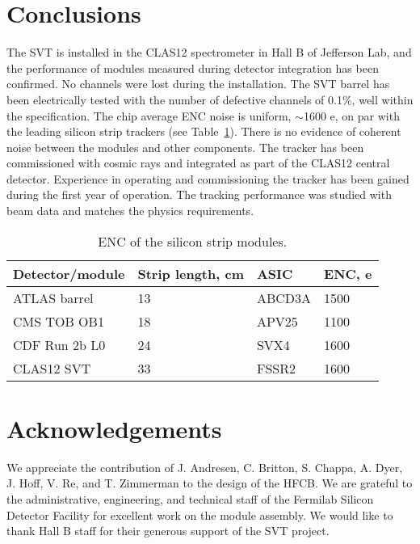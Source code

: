 \section{Conclusions}

The SVT is installed in the CLAS12 spectrometer in Hall B of Jefferson Lab, and the performance of modules measured during detector integration has been confirmed. No channels were lost during the installation. The SVT barrel has been electrically  tested with the number of defective channels of 0.1$\%$, well within the specification. The chip average ENC noise is uniform, $\sim$1600 e, on par with the leading silicon strip trackers (see Table~\ref{tab:enc-table}). There is no evidence of coherent noise between the modules and other components. The tracker has been commissioned with cosmic rays and integrated as part of the CLAS12 central detector. Experience in operating and commissioning the tracker has been gained during the first year of operation. The tracking performance was studied with beam data and matches the physics requirements. 

\begin{table}[hbt]
\begin{tabular}{llll}
\hline
Detector/module      & Strip length, cm & ASIC         & ENC, e\\ \hline
ATLAS barrel           & 13                      & ABCD3A    & 1500  \\
CMS TOB OB1        & 18                      & APV25       & 1100  \\
CDF Run 2b L0        & 24                     & SVX4         & 1600  \\
CLAS12 SVT            & 33                     & FSSR2       & 1600 \\ \hline
\end{tabular}
\caption{ENC of the silicon strip modules.}
\label{tab:enc-table}
\end{table}

\section{Acknowledgements}

We appreciate the contribution of J.  Andresen, C. Britton, S. Chappa, A. Dyer, J. Hoff, V. Re, and T. Zimmerman to the design of the HFCB. We are grateful to the administrative, engineering, and technical staff of the Fermilab Silicon Detector Facility for excellent work on the module assembly. We would like to thank Hall B staff for their generous support of the SVT project.



